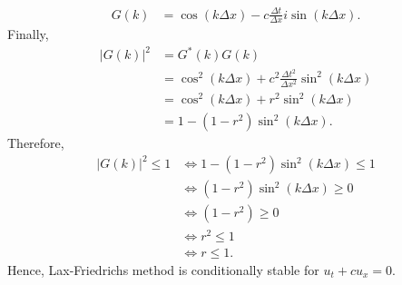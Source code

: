 \begin{questions}
\begin{solution}
\begin{align*}
G(k)&=\cos(k\Delta x)-c\frac{\Delta t}{\Delta x}i\sin(k\Delta x).
\end{align*}
Finally,
\begin{align*}
|G(k)|^2 &= G^*(k) G(k)\\
&= \cos^2(k\Delta x)+c^2\frac{\Delta t^2}{\Delta x^2}\sin^2(k\Delta x)\\
&= \cos^2(k\Delta x)+r^2\sin^2(k\Delta x)\\
&=1-\left(1-r^2\right)\sin^2(k\Delta x).
\end{align*}
Therefore,
\begin{align*}
|G(k)|^2\leq 1&\iff 1-\left(1-r^2\right)\sin^2(k\Delta x)\leq 1\\
&\iff \left(1-r^2\right)\sin^2(k\Delta x)\geq 0\\
&\iff \left(1-r^2\right)\geq 0\\
&\iff r^2\leq 1 \\
&\iff r\leq 1.
\end{align*}
Hence, Lax-Friedrichs method is conditionally stable for $u_t + c u_x = 0$.
\end{solution}
\end{questions}
